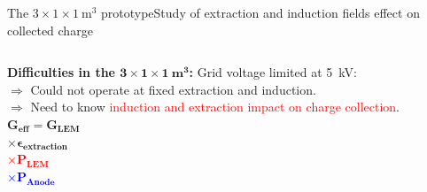 \documentclass[10pt]{beamer}
\begin{document}
    \begin{frame}{The \texorpdfstring{$3 \times 1 \times \SI{1}{\meter\cubed}$}{311} prototype}{Study of extraction and induction fields effect on collected charge}
    	\begin{scriptsize}
    		\begin{columns}
    			\hspace{-1.5cm}
	    		\begin{column}{0.35\textwidth}
	    			\textbf{Difficulties in the $\mathbf{3 \times 1 \times \SI[detect-weight]{1}{\meter\cubed}}$:} Grid voltage limited at \SI{5}{\kilo\volt}:\\
	    			\vspace{0.3cm}
	    			$\Rightarrow$ Could not operate at fixed extraction and induction.\\
	    			$\Rightarrow$ Need to know \textcolor{red}{induction and extraction impact on charge collection}.\\
	    			\vspace{0.3cm}	    			
		    		$\mathbf{G_{eff} = G_{LEM}} $ \\\hspace{0.7cm} $\boldsymbol{\times \epsilon}_{\mathbf{extraction}}$ \\\hspace{0.7cm} \textcolor{red}{$\boldsymbol{\times} \mathbf{P_{LEM}}$}\\\hspace{0.7cm} \textcolor{blue}{$\boldsymbol{\times} \mathbf{P_{Anode}}$}

\end{column}
\end{columns}
\end{scriptsize}
\end{frame}
\end{document}
